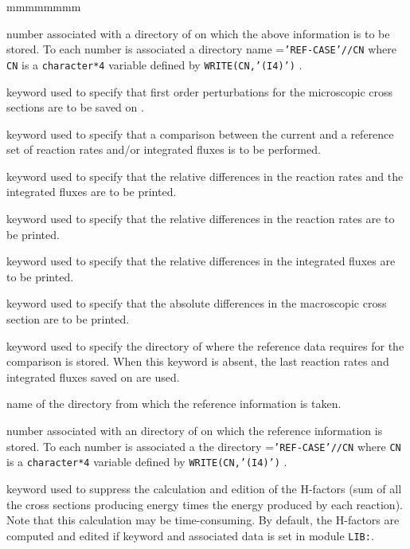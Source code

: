 \begin{ListeDeDescription}{mmmmmmmm}
\item[\dusa{idirn}] number associated with a directory of  on
which the above information is to be stored. To each number  is
associated a directory name ={\tt 'REF-CASE'//CN} where {\tt CN} is a
{\tt character*4} variable defined by {\tt WRITE(CN,'(I4)')} .

\item[\moc{PERT}] keyword used to specify that first order perturbations for 
the microscopic cross sections are to be saved on . 

\item[\moc{STAT}] keyword used to specify that a comparison between the current and
a reference set of reaction rates and/or integrated fluxes is to be performed. 

\item[\moc{ALL}] keyword used to specify that the relative differences in the
reaction rates and the integrated fluxes are to be printed.

\item[\moc{RATE}] keyword used to specify that the relative differences in the
reaction rates are to be printed.

\item[\moc{FLUX}] keyword used to specify that the relative differences in the
integrated fluxes are to be printed. 

\item[\moc{DELS}] keyword used to specify that the absolute differences in the
macroscopic cross section are to be printed.

\item[\moc{REFE}] keyword used to specify the directory of  where the
reference data requires for the comparison is stored. When this keyword is
absent, the last reaction rates and integrated fluxes saved on  are
used.

\item[\dusa{DIRO}] name of the directory from which the reference information
is taken.

\item[\dusa{idiro}] number associated with an directory of  on
which the reference information is  stored. To each number  is
associated a the directory  ={\tt 'REF-CASE'//CN} where {\tt CN} is a
{\tt character*4} variable defined by {\tt WRITE(CN,'(I4)')} . 

\item[\moc{NOHF}] keyword used to suppress the calculation and edition of the H-factors (sum of all
the cross sections producing energy times the energy produced by each reaction).
Note that this calculation may be time-consuming. By default, the H-factors are
computed and edited if keyword  and associated data is set in module {\tt LIB:}.


\end{ListeDeDescription}

